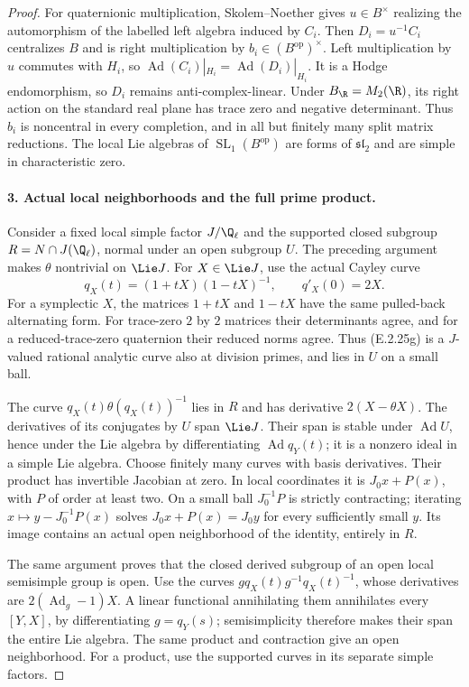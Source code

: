 \begin{proof}
For quaternionic multiplication, Skolem--Noether
gives \(u\in B^\times\) realizing the automorphism
of the labelled left algebra induced by \(C_i\).
Then \(D_i=u^{-1}C_i\) centralizes \(B\) and is
right multiplication by \(b_i\in(B^{\mathrm{op}})^\times\).
Left multiplication by \(u\) commutes with \(H_i\),
so \(\operatorname{Ad}(C_i)|_{H_i}
=\operatorname{Ad}(D_i)|_{H_i}\). It is a Hodge
endomorphism, so \(D_i\) remains anti-complex-linear.
Under \(B_\R=M_2(\R)\), its right action on the
standard real plane has trace zero and negative
determinant. Thus \(b_i\) is noncentral in every
completion, and in all but finitely many split
matrix reductions. The local Lie algebras of
\(\operatorname{SL}_1(B^{\mathrm{op}})\) are forms
of \(\mathfrak{sl}_2\) and are simple in
characteristic zero.

\paragraph{3. Actual local neighborhoods and the full prime product.}
Consider a fixed local simple factor \(J/\Q_\ell\)
and the supported closed subgroup
\(R=N\cap J(\Q_\ell)\), normal under an open
subgroup \(U\). The preceding argument makes
\(\theta\) nontrivial on \(\Lie J\). For
\(X\in\Lie J\), use the actual Cayley curve
\[
 q_X(t)=(1+tX)(1-tX)^{-1},\qquad q'_X(0)=2X.
 \tag{E.2.25g}
\]
For a symplectic \(X\), the matrices \(1+tX\)
and \(1-tX\) have the same pulled-back alternating
form. For trace-zero \(2\) by \(2\) matrices
their determinants agree, and for a reduced-trace-zero
quaternion their reduced norms agree. Thus (E.2.25g)
is a \(J\)-valued rational analytic curve also at
division primes, and lies in \(U\) on a small ball.

The curve \(q_X(t)\theta(q_X(t))^{-1}\) lies in
\(R\) and has derivative \(2(X-\theta X)\).
The derivatives of its conjugates by \(U\) span
\(\Lie J\). Their span is stable under
\(\operatorname{Ad}U\), hence under the Lie
algebra by differentiating \(\operatorname{Ad}q_Y(t)\);
it is a nonzero ideal in a simple Lie algebra.
Choose finitely many curves with basis derivatives.
Their product has invertible Jacobian at zero.
In local coordinates it is \(J_0x+P(x)\), with
\(P\) of order at least two. On a small ball
\(J_0^{-1}P\) is strictly contracting; iterating
\(x\mapsto y-J_0^{-1}P(x)\) solves
\(J_0x+P(x)=J_0y\) for every sufficiently small
\(y\). Its image contains an actual open
neighborhood of the identity, entirely in \(R\).

The same argument proves that the closed derived
subgroup of an open local semisimple group is open.
Use the curves
\(gq_X(t)g^{-1}q_X(t)^{-1}\), whose derivatives are
\(2(\operatorname{Ad}_g-1)X\). A linear functional
annihilating them annihilates every \([Y,X]\),
by differentiating \(g=q_Y(s)\); semisimplicity
therefore makes their span the entire Lie algebra.
The same product and contraction give an open
neighborhood. For a product, use the supported
curves in its separate simple factors.


\end{proof}
